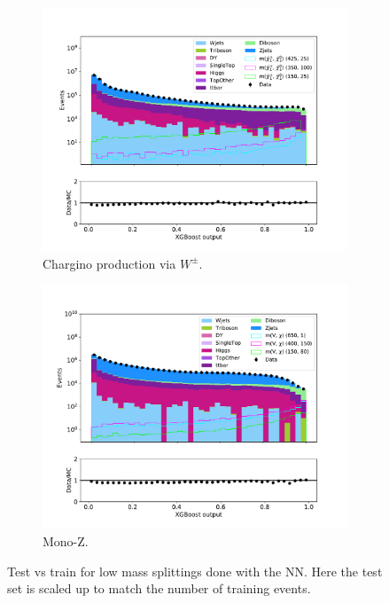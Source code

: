 \begin{figure}[H]
\begin{subfigure}[t!]{0.49\textwidth}
        \label{fig:SlepsnuNNLow}
    \end{subfigure}      
    \begin{subfigure}[t!]{0.49\textwidth}
        \includegraphics[width = \textwidth]{Figures/Stacked/stackedplot_BDT_Low_level_WW.pdf}
        \caption{Chargino production via $W^\pm$.}
        \label{fig:WWNNLow}
    \end{subfigure}
    \begin{subfigure}[t!]{0.49\textwidth}
        \includegraphics[width = \textwidth]{Figures/Stacked/stackedplot_BDT_Low_level_monoZ.pdf}
        \caption{Mono-Z.}
        \label{fig:MonoZNNLow}
    \end{subfigure}
    \caption{Test vs train for low mass splittings done with the NN. Here the test set is scaled up to match the number of training events.}
    \label{fig:AllLowNN}
\end{figure}

